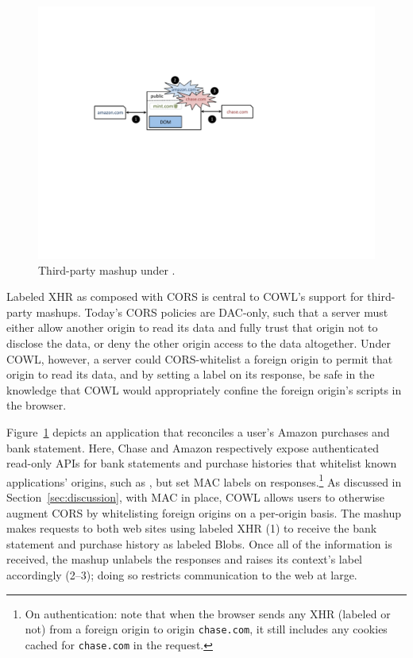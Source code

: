 \begin{figure}
\centerline{\includegraphics[width=\columnwidth]{mashup}}
\caption{\label{fig:mashup} Third-party mashup under \sys{}.}
\end{figure}
Labeled XHR as composed with CORS is central to COWL's support for
third-party mashups.
%
Today's CORS policies are DAC-only, such that a server must either
allow another origin to read its data and fully trust that origin not
to disclose the data, or deny the other origin access to the data
altogether. Under COWL, however, a server could CORS-whitelist a
foreign origin to permit that origin to read its data, and by setting
a label on its response, be safe in the knowledge that COWL would
appropriately confine the foreign origin's scripts in the browser.
 
Figure~\ref{fig:mashup} depicts an application that reconciles a
user's Amazon purchases and bank statement.
%
Here, Chase and Amazon respectively expose authenticated read-only
APIs for bank statements and purchase histories that whitelist known
applications' origins, such as , but set MAC labels on
responses.\footnote{On authentication: note that when the browser
  sends any XHR (labeled or not) from a foreign origin to origin
  \texttt{chase.com}, it still includes any cookies cached for
  \texttt{chase.com} in the request.}
%
As discussed in Section~\ref{sec:discussion}, with MAC in place, COWL
allows users to otherwise augment CORS by whitelisting foreign origins
on a per-origin basis.
%
%
The mashup makes requests to both web sites using labeled XHR (1)
to receive the bank statement and
purchase history as labeled Blobs.
%
Once all of the information is received, the mashup unlabels the
responses and raises its context's label accordingly (2--3); doing so
restricts communication to the web at large.

